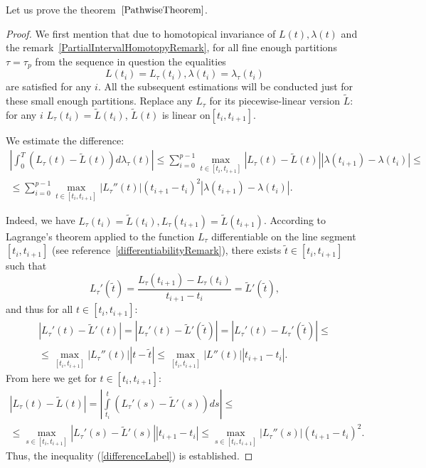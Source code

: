 \documentclass[12pt, a4paper, titlepage]{article}
\begin{document}
 Let us prove the theorem~$\ref{PathwiseTheorem}$.
\begin{proof}
We first mention that due to homotopical invariance of $L(t),\lambda(t)$ 
and the remark~\ref{PartialIntervalHomotopyRemark}, for all fine enough
partitions $\tau=\tau_p$ from the sequence in question the equalities  
$$L(t_i)=L_{\tau}(t_i), \lambda(t_i)=\lambda_{\tau}(t_i)$$
are satisfied for any $i$. All the subsequent estimations will be conducted just
for these small enough partitions. 
Replace any $L_{\tau}$ for its piecewise-linear version $\tilde{L}$:
for any $i$ $L_{\tau}(t_i)=\tilde{L}(t_i)$, $\tilde{L}(t)$ is linear on$[t_i,t_{i+1}]$.

We estimate the difference: 
\begin{eqnarray}\label{differenceLabel}
 \left|\int_{0}^T (L_{\tau}(t)-\tilde{L}(t))d\lambda_{\tau}(t)\right|
\le\sum_{i=0}^{p-1}\max_{t\in [t_i,t_{i+1}]}|L_{\tau}(t)-\tilde{L}(t)||\lambda(t_{i+1})-\lambda(t_i)|\le \nonumber \\
\le \sum_{i=0}^{p-1}\max_{t \in [t_i, t_{i+1}]}|L_{\tau}''(t)|(t_{i+1}-t_i)^2 |\lambda(t_{i+1})-\lambda(t_i)|.
\end{eqnarray}

 Indeed, we have $L_{\tau}(t_i)=\tilde{L}(t_i), L_{\tau}(t_{i+1})=\tilde{L}(t_{i+1})$.
According to Lagrange's theorem applied to the 
function $L_{\tau}$ differentiable on the line segment $[t_i,t_{i+1}]$
(see reference~\ref{differentiabilityRemark}), there exists
$\tilde{t}\in [t_{i},t_{i+1}]$ such that
$$L_{\tau}'(\tilde{t})=
\frac{L_{\tau}(t_{i+1})-L_{\tau}(t_i)}{t_{i+1}-t_i}=\tilde{L}'(\tilde{t}),$$
and thus for all $t\in[t_i,t_{i+1}]:$
\begin{multline*}
 |L_{\tau}'(t)-\tilde{L}'(t)|=|L_{\tau}'(t)-\tilde{L}'(\tilde{t})|=
|L_{\tau}'(t)-L_{\tau}'(\tilde{t})|
\le \\ \le
\max_{[t_i, t_{i+1}]}|L_{\tau}''(t)| |t-\tilde{t}|\le 
\max_{[t_i, t_{i+1}]}|L''(t)| |t_{i+1}-t_i|.
\end{multline*}
From here we get for $t\in[t_i,t_{i+1}]$:
\begin{multline*}
 |L_{\tau}(t)-\tilde{L}(t)| = 
\left|\int\limits_{t_i}^{t}(L_{\tau}'(s)-\tilde{L}'(s))ds\right|
\le \\ \le
\max_{s \in [t_i,t_{i+1}]}|L_{\tau}'(s)-\tilde{L}'(s)||t_{i+1}-t_{i}|
\le 
\max_{s \in [t_i, t_{i+1}]}|L_{\tau}''(s)| (t_{i+1}-t_i)^2.
\end{multline*}
 Thus, the inequality (\ref{differenceLabel}) is established.


\end{proof}
\end{document}
